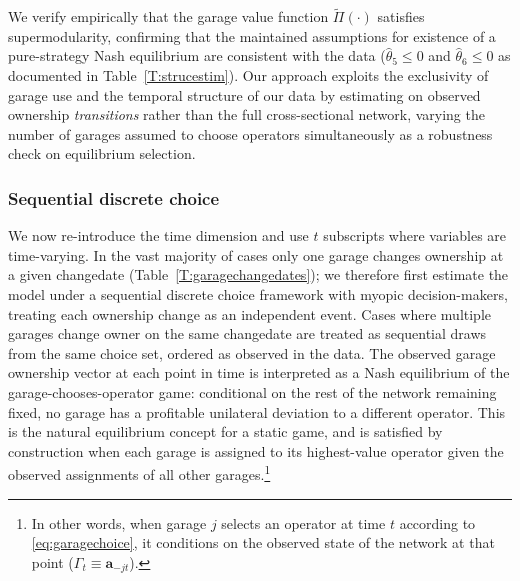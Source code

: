 \documentclass[12pt]{article}
\begin{document}
We verify empirically that the garage value function $\tilde{\Pi}(\cdot)$ satisfies supermodularity, confirming that the maintained assumptions for existence of a pure-strategy Nash equilibrium are consistent with the data ($\hat{\theta}_5 \leq 0$ and $\hat{\theta}_6 \leq 0$ as documented in Table~\ref{T:strucestim}). Our approach exploits the exclusivity of garage use and the temporal structure of our data by estimating on observed ownership \emph{transitions} rather than the full cross-sectional network, varying the number of garages assumed to choose operators simultaneously as a robustness check on equilibrium selection.


\subsubsection{Sequential discrete choice}\label{sec:seq-choice}
We now re-introduce the time dimension and use $t$ subscripts where variables 
are time-varying. In the vast majority of cases only one garage changes 
ownership at a given changedate (Table~\ref{T:garagechangedates}); we 
therefore first estimate the model under a sequential discrete choice 
framework with myopic decision-makers, treating each ownership change as an 
independent event. Cases where multiple garages change owner on the same 
changedate are treated as sequential draws from the same choice set, ordered 
as observed in the data. The observed garage ownership vector at each point 
in time is interpreted as a Nash equilibrium of the garage-chooses-operator 
game: conditional on the rest of the network remaining fixed, no garage has 
a profitable unilateral deviation to a different operator. This is the natural 
equilibrium concept for a static game, and is satisfied by construction when 
each garage is assigned to its highest-value operator given the observed 
assignments of all other garages.\footnote{In other words, when garage $j$ selects an operator at time 
$t$ according to \eqref{eq:garagechoice}, it conditions on the observed state 
of the network at that point ($\Gamma_t \equiv \mathbf{a}_{-jt}$).}
\end{document}
